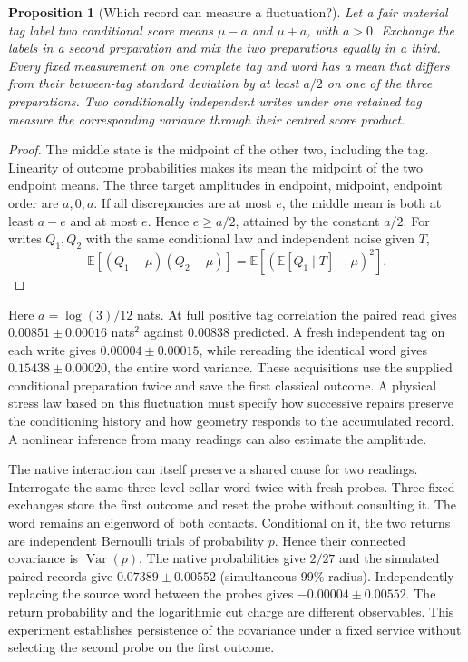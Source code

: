 \documentclass[11pt]{article}
\newtheorem{proposition}[theorem]{Proposition}
\begin{document}
\begin{proposition}[Which record can measure a fluctuation?]
Let a fair material tag label two conditional score means $\mu-a$ and
$\mu+a$, with $a>0$. Exchange the labels in a second preparation and mix
the two preparations equally in a third. Every fixed measurement on one
complete tag and word has a mean that differs from their between-tag
standard deviation by at least $a/2$ on one of the three preparations.
Two conditionally independent writes under one retained tag measure
the corresponding variance through their centred score product.
\end{proposition}
\begin{proof}
The middle state is the midpoint of the other two, including the tag.
Linearity of outcome probabilities makes its mean the midpoint of the
two endpoint means. The three target amplitudes in endpoint, midpoint,
endpoint order are $a,0,a$. If all discrepancies are at most $e$, the
middle mean is both at least $a-e$ and at most $e$. Hence $e\ge a/2$,
attained by the constant $a/2$. For writes $Q_1,Q_2$ with the same
conditional law and independent noise given $T$,
\[
 \mathbb E[(Q_1-\mu)(Q_2-\mu)]
 =\mathbb E[(\mathbb E[Q_1\mid T]-\mu)^2].
\]
\end{proof}
Here $a=\log(3)/12$ nats. At full positive tag correlation the paired
read gives $0.00851\pm0.00016$ nats$^2$ against $0.00838$ predicted.
A fresh independent tag on each write gives $0.00004\pm0.00015$,
while rereading the identical word gives $0.15438\pm0.00020$, the
entire word variance. These acquisitions use the supplied conditional
preparation twice and save the first classical outcome. A physical
stress law based on this fluctuation must specify how successive
repairs preserve the conditioning history and how geometry responds to
the accumulated record. A nonlinear inference from many readings can
also estimate the amplitude.

The native interaction can itself preserve a shared cause for two
readings. Interrogate the same three-level collar word twice with
fresh probes. Three fixed exchanges store the first outcome and reset
the probe without consulting it. The word remains an eigenword of both
contacts. Conditional on it, the two returns are independent Bernoulli
trials of probability $p$. Hence their connected covariance is
$\operatorname{Var}(p)$. The native probabilities give $2/27$ and the
simulated paired records give $0.07389\pm0.00552$ (simultaneous 99\%
radius). Independently replacing the source word between the probes
gives $-0.00004\pm0.00552$. The return probability and the logarithmic
cut charge are different observables. This experiment establishes
persistence of the covariance under a fixed service without selecting
the second probe on the first outcome.
\end{document}
